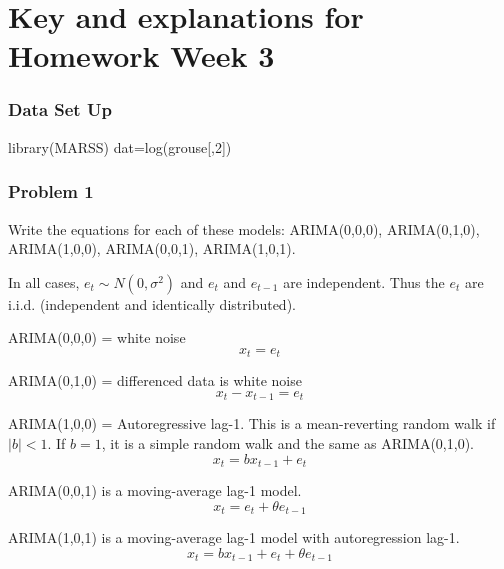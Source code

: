 

\setcounter{MaxMatrixCols}{20}
\usepackage{enumerate}
\usepackage{Sweave}




\setlength{\parskip}{0.5em}



\chapter{Key and explanations for Homework Week 3}
\subsection*{Data Set Up}
\begin{Schunk}
\begin{Sinput}
 library(MARSS)
 dat=log(grouse[,2])
\end{Sinput}
\end{Schunk}

\subsection*{Problem 1}
\item Write the equations for each of these models: ARIMA(0,0,0), ARIMA(0,1,0), ARIMA(1,0,0), ARIMA(0,0,1), ARIMA(1,0,1).  

In all cases, $e_t \sim N(0,\sigma^2)$ and $e_t$ and $e_{t-1}$ are independent.  Thus the $e_t$ are i.i.d. (independent and identically distributed).

ARIMA(0,0,0) = white noise
$$x_t = e_t$$

ARIMA(0,1,0) = differenced data is white noise
$$x_t - x_{t-1} = e_t$$

ARIMA(1,0,0) = Autoregressive lag-1.  This is a mean-reverting random walk if $|b|<1$. If $b=1$, it is a simple random walk and the same as ARIMA(0,1,0).
$$x_t = bx_{t-1} + e_t$$

ARIMA(0,0,1) is a moving-average lag-1 model.
$$x_t = e_t + \theta e_{t-1}$$

ARIMA(1,0,1) is a moving-average lag-1 model with autoregression lag-1.
$$x_t = b x_{t-1} + e_t + \theta e_{t-1}$$


